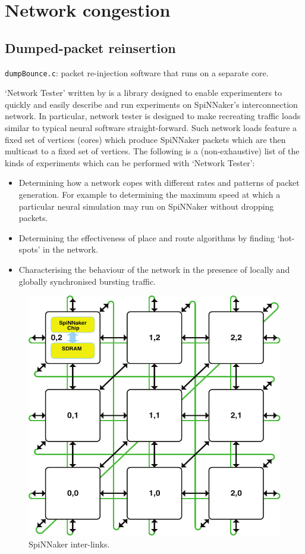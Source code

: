 \documentclass[a4paper, 11pt]{article}
\newlength\drop
\begin{document}
\clearpage
\section{Network congestion}
\label{sec:congestion}

\subsection{Dumped-packet reinsertion}

\verb|dumpBounce.c|:  packet re-injection software that runs on a separate core.
 
`Network Tester' written by \citet{heathcote2015networktester} is a library designed to enable experimenters to quickly and easily describe and run experiments on SpiNNaker's interconnection network. In particular, network tester is designed to make recreating traffic loads similar to typical neural software straight-forward. Such network loads feature a fixed set of vertices (cores) which produce SpiNNaker packets which are then multicast to a fixed set of vertices.
The following is a (non-exhaustive) list of the kinds of experiments which can be performed with `Network Tester':
\begin{itemize}
\item Determining how a network copes with different rates and patterns of packet generation. For example to determining the maximum speed at which a particular neural simulation may run on SpiNNaker without dropping
packets.
\item Determining the effectiveness of place and route algorithms by finding `hot-spots' in the network.
\item Characterising the behaviour of the network in the presence of locally and globally synchronised bursting traffic.
\end{itemize}

\begin{figure}[htbp]
	\centering
	\includegraphics[width=0.4\linewidth]{images/system_architecture.pdf}
	\caption{SpiNNaker inter-links.}
	\label{fig:interchip_links}	
\end{figure}
\end{document}
